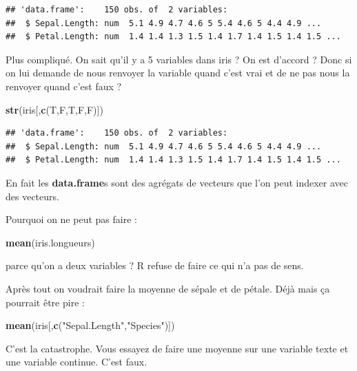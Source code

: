 \documentclass[
]{book}
\newenvironment{Shaded}{\begin{snugshade}}{\end{snugshade}}
\newcommand{\FunctionTok}[1]{\textcolor[rgb]{0.13,0.29,0.53}{\textbf{#1}}}
\newcommand{\NormalTok}[1]{#1}
\newcommand{\StringTok}[1]{\textcolor[rgb]{0.31,0.60,0.02}{#1}}
\begin{document}
\begin{verbatim}
## 'data.frame':    150 obs. of  2 variables:
##  $ Sepal.Length: num  5.1 4.9 4.7 4.6 5 5.4 4.6 5 4.4 4.9 ...
##  $ Petal.Length: num  1.4 1.4 1.3 1.5 1.4 1.7 1.4 1.5 1.4 1.5 ...
\end{verbatim}

Plus compliqué. On sait qu'il y a 5 variables dans iris ? On est d'accord ?
Donc si on lui demande de nous renvoyer la variable quand c'est vrai et de ne pas
nous la renvoyer quand c'est faux ?

\begin{Shaded}
\begin{Highlighting}[]
\FunctionTok{str}\NormalTok{(iris[,}\FunctionTok{c}\NormalTok{(T,F,T,F,F)])}
\end{Highlighting}
\end{Shaded}

\begin{verbatim}
## 'data.frame':    150 obs. of  2 variables:
##  $ Sepal.Length: num  5.1 4.9 4.7 4.6 5 5.4 4.6 5 4.4 4.9 ...
##  $ Petal.Length: num  1.4 1.4 1.3 1.5 1.4 1.7 1.4 1.5 1.4 1.5 ...
\end{verbatim}

En fait les \textbf{data.frame}s sont des agrégats de vecteurs que l'on peut indexer
avec des vecteurs.

Pourquoi on ne peut pas faire :

\begin{Shaded}
\begin{Highlighting}[]
\FunctionTok{mean}\NormalTok{(iris.longueurs)}
\end{Highlighting}
\end{Shaded}

parce qu'on a deux variables ? R refuse de faire ce qui n'a pas de sens.

Après tout on voudrait faire la moyenne de sépale et de pétale. Déjà mais
ça pourrait être pire :

\begin{Shaded}
\begin{Highlighting}[]
\FunctionTok{mean}\NormalTok{(iris[,}\FunctionTok{c}\NormalTok{(}\StringTok{"Sepal.Length"}\NormalTok{,}\StringTok{"Species"}\NormalTok{)])}
\end{Highlighting}
\end{Shaded}

C'est la catastrophe. Vous essayez de faire une moyenne sur une variable texte
et une variable continue. C'est faux.
\end{document}
